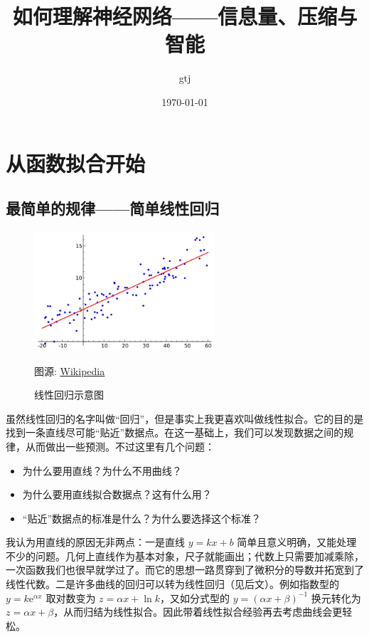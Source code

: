 \documentclass[UTF8, 12pt]{article}
\title{如何理解神经网络——信息量、压缩与智能}
\author{gtj}
\date{\today}
\newcommand{\uhref}[2]{\href{#1}{\underline{#2}}}
\begin{document}
\maketitle

\tableofcontents

\newpage

\section{从函数拟合开始}
\subsection{最简单的规律——简单线性回归}

\begin{figure}[h]
    \centering
    \includegraphics[width=0.6\textwidth]{png/linear_regression.png}
    \caption{线性回归示意图}
    {图源: \uhref{https://en.wikipedia.org/wiki/Linear_regression}{Wikipedia}}
    \label{fig:linear_regression}
\end{figure}

虽然线性回归的名字叫做“回归”，但是事实上我更喜欢叫做线性拟合。它的目的是找到一条直线尽可能“贴近”数据点。在这一基础上，我们可以发现数据之间的规律，从而做出一些预测。不过这里有几个问题：
\begin{itemize}
    \item 为什么要用直线？为什么不用曲线？
    \item 为什么要用直线拟合数据点？这有什么用？
    \item “贴近”数据点的标准是什么？为什么要选择这个标准？
\end{itemize}

我认为用直线的原因无非两点：一是直线 $y = kx+b$ 简单且意义明确，又能处理不少的问题。几何上直线作为基本对象，尺子就能画出；代数上只需要加减乘除，一次函数我们也很早就学过了。而它的思想一路贯穿到了微积分的导数并拓宽到了线性代数。二是许多曲线的回归可以转为线性回归（见后文）。例如指数型的 $y = k \mathrm{e}^{\alpha x}$ 取对数变为 $z = \alpha x + \ln k$，又如分式型的 $y = (\alpha x + \beta)^{-1}$ 换元转化为 $z = \alpha x + \beta$，从而归结为线性拟合。因此带着线性拟合经验再去考虑曲线会更轻松。
\end{document}

